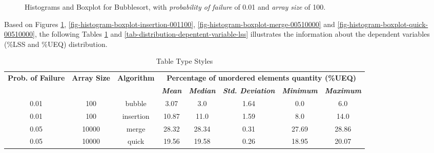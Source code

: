 \begin{figure}[H]
    \centering
    \caption{Histograms and Boxplot for Bubblesort, with \textit{probability of failure} of 0.01 and \textit{array size} of 100.}
    \label{fig-histogram-boxplot-bubble-001100}
\end{figure}

Based on Figures \ref{fig-histogram-boxplot-bubble-001100}, \ref{fig-histogram-boxplot-insertion-001100}, \ref{fig-histogram-boxplot-merge-00510000} and \ref{fig-histogram-boxplot-quick-00510000}, the following Tables \ref{tab-distribution-depentent-variable-ueq} and \ref{tab-distribution-depentent-variable-lss} illustrates the information about the dependent variables (\%LSS and \%UEQ) distribution.

\begin{table}[H]
    \caption{Table Type Styles}
    \begin{center}
    \begin{tabular}{|c|c|c|c|c|c|c|c|}
    \hline
    \textbf{Prob. of Failure} & \textbf{Array Size} & \textbf{Algorithm} & \multicolumn{5}{|c|}{\textbf{Percentage of unordered elements quantity (\%UEQ)}} \\
    \cline{4-8} 
    & & & \textbf{\textit{Mean}}& \textbf{\textit{Median}} & \textbf{\textit{Std. Deviation}} & \textbf{\textit{Minimum}} & \textbf{\textit{Maximum}} \\
    \hline
    0.01 & 100 & bubble & 3.07 & 3.0 & 1.64 & 0.0 & 6.0 \\
    \hline
    0.01 & 100 & insertion & 10.87 & 11.0 & 1.59 & 8.0 & 14.0 \\
    \hline
    0.05 & 10000 & merge & 28.32 & 28.34 & 0.31 & 27.69 & 28.86 \\
    \hline
    0.05 & 10000 & quick & 19.56 & 19.58 & 0.26 & 18.95 & 20.07 \\
    \hline
    \end{tabular}
    \label{tab-distribution-depentent-variable-ueq}
    \end{center}
\end{table}

